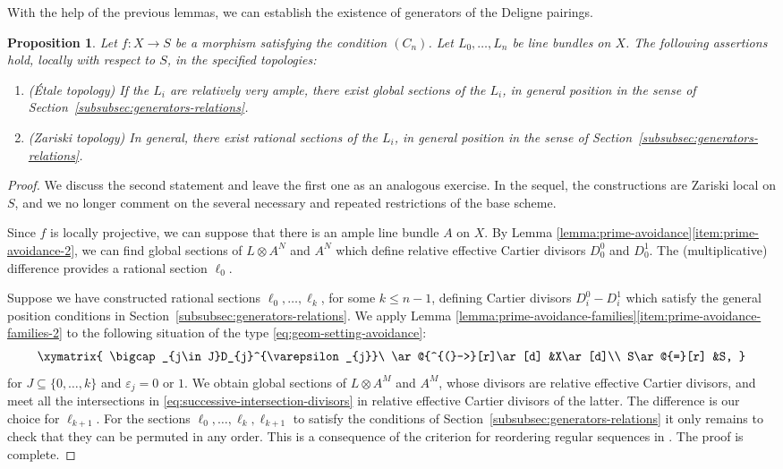 \documentclass[JEP,XML,SOM,Unicode,published]{cedram}
\let\epsilon\varepsilon
\theoremstyle{plain}
\newtheorem{proposition}[theorem]{Proposition}
\theoremstyle{definition}
\begin{document}
With the help of the previous lemmas, we can establish the existence of generators of the Deligne pairings.
\begin{proposition}\label{prop:construction-generators}
Let $f\colon X\to S$ be a morphism satisfying the condition $(C_{n})$. Let $L_{0},\ldots, L_{n}$ be line bundles on $X$. The following assertions hold, locally with respect to $S$, in the specified topologies:
\begin{enumerate}
\item\label{item:construction-generators-1} (Étale topology) If the $L_{i}$ are relatively very ample, there exist global sections of the $L_{i}$, in general position in the sense of Section~\ref{subsubsec:generators-relations}.
\item\label{item:construction-generators-2} (Zariski topology) In general, there exist rational sections of the $L_{i}$, in general position in the sense of Section~\ref{subsubsec:generators-relations}.
\end{enumerate}
\end{proposition}
\begin{proof}
We discuss the second statement and leave the first one as an analogous exercise. In the sequel, the constructions are Zariski local on $S$, and we no longer comment on the several necessary and repeated restrictions of the base scheme.

Since $f$ is locally projective, we can suppose that there is an ample line bundle $A$ on $X$. By Lemma \ref{lemma:prime-avoidance}\eqref{item:prime-avoidance-2}, we can find global sections of $L\otimes A^{N}$ and $A^{N}$ which define relative effective Cartier divisors $D_{0}^{0}$ and $D_{0}^{1}$. The (multiplicative) difference provides a rational section $\ell_{0}$.

Suppose we have constructed rational sections $\ell_{0},\ldots, \ell_{k}$, for some $k\leq n-1$, defining Cartier divisors $D_{i}^{0}-D_{i}^{1}$ which satisfy the general position conditions in Section~\ref{subsubsec:generators-relations}. We apply Lemma \ref{lemma:prime-avoidance-families}\eqref{item:prime-avoidance-families-2} to the following situation of the type \eqref{eq:geom-setting-avoidance}:
\begin{equation}\label{eq:successive-intersection-divisors}
\xymatrix{
\bigcap_{j\in J}D_{j}^{\epsilon_{j}}\ \ar@{^{(}->}[r]\ar[d] &X\ar[d]\\
S\ar@{=}[r] &S,
}
\end{equation}
for $J\subseteq\lbrace 0,\ldots, k\rbrace$ and $\epsilon_{j}= 0$ or $1$. We obtain global sections of $L\otimes A^{M}$ and $A^{M}$, whose divisors are relative effective Cartier divisors, and meet all the intersections in \eqref{eq:successive-intersection-divisors} in relative effective Cartier divisors of the latter. The difference is our choice for $\ell_{k+1}$. For the sections $\ell_{0},\ldots,\ell_{k},\ell_{k+1}$ to satisfy the conditions of Section~\ref{subsubsec:generators-relations} it only remains to check that they can be permuted in any order. This is a consequence of the criterion for reordering regular sequences in \cite[\href{https://stacks.math.columbia.edu/tag/01ZM}{07DW}]{stacks-project}. The proof is complete.
\end{proof}
\end{document}
